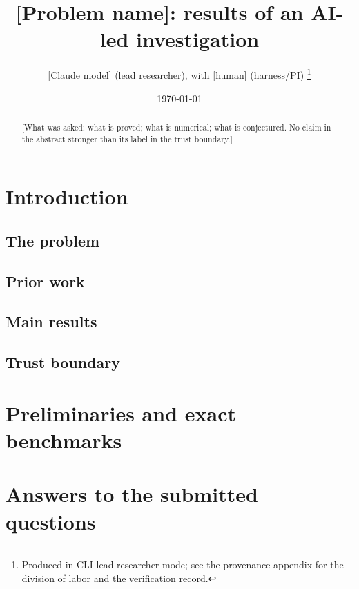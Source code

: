 \documentclass[11pt]{article}
\title{[Problem name]: results of an AI-led investigation}
\author{[Claude model] (lead researcher), with [human] (harness/PI)%
\thanks{Produced in CLI lead-researcher mode; see the provenance
appendix for the division of labor and the verification record.}}
\date{\today}
\theoremstyle{remark}
\begin{document}
\maketitle

\begin{abstract}
[What was asked; what is proved; what is numerical; what is
conjectured. No claim in the abstract stronger than its label in the
trust boundary.]
\end{abstract}

\section{Introduction}
\subsection{The problem}
\subsection{Prior work}
\subsection{Main results}
\subsection{Trust boundary}\label{sec:trust}

\section{Preliminaries and exact benchmarks}


\section{Answers to the submitted questions}
\end{document}
